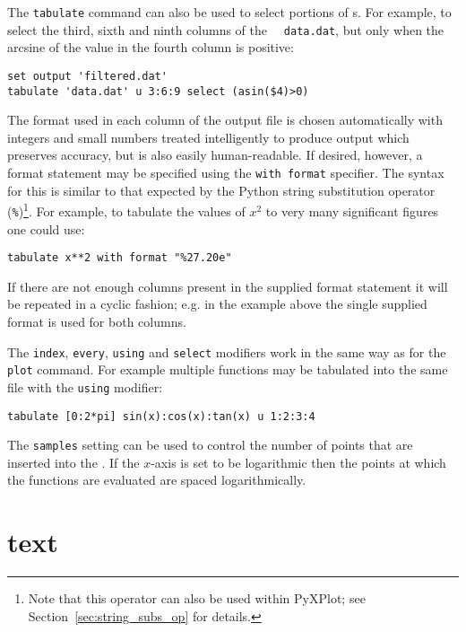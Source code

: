 The {\tt tabulate} command can also be used to select portions of \datafile s.
For example, to select the third, sixth and ninth columns of the \datafile\ {\tt
data.dat}, but only when the arcsine of the value in the fourth column is
positive:

\begin{verbatim}
set output 'filtered.dat'
tabulate 'data.dat' u 3:6:9 select (asin($4)>0)
\end{verbatim}

The format used in each column of the output file is chosen automatically with
integers and small numbers treated intelligently to produce output which
preserves accuracy, but is also easily human-readable. If desired, however, a
format statement may be specified using the {\tt with format} specifier. The
syntax for this is similar to that expected by the Python string substitution
operator ({\tt \%})\footnote{Note that this operator can also be used
within PyXPlot; see Section~\ref{sec:string_subs_op} for details.}.  For example,
to tabulate the values of $x^2$ to very many significant figures one could use:

\begin{verbatim}
tabulate x**2 with format "%27.20e"
\end{verbatim}

If there are not enough columns present in the supplied format statement it
will be repeated in a cyclic fashion; e.g. in the example above the single
supplied format is used for both columns.

The {\tt index}, {\tt every}, {\tt using} and {\tt select} modifiers work in the
same way as for the {\tt plot} command.  For example multiple functions may be
tabulated into the same file with the {\tt using} modifier:

\begin{verbatim}
tabulate [0:2*pi] sin(x):cos(x):tan(x) u 1:2:3:4
\end{verbatim}

The {\tt samples} setting can be used to control the number of points that are
inserted into the \datafile.  If the $x$-axis is set to be logarithmic then the
points at which the functions are evaluated are spaced logarithmically.

\section{text}

